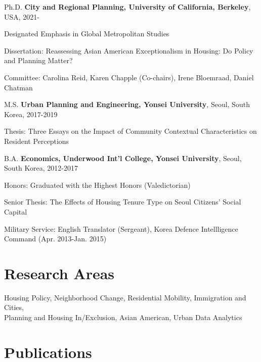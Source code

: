 \documentclass[12pt,letterpaper]{report}
\newcommand{\listitemspace}{0.4em}
\renewenvironment{itemize}
{\begin{list}{}{\setlength{\leftmargin}{0.5em}
                \setlength{\parskip}{0em}
                \setlength{\itemsep}{\listitemspace}
                \setlength{\parsep}{\listitemspace}}}
{\end{list}}
\begin{document}
    \begin{tablist}
      \item[Ph.D.] \tab{}\textbf{City and Regional Planning, University of California, Berkeley}, USA, 2021-
      \item \tab{}Designated Emphasis in Global Metropolitan Studies
      \begin{itemize}
        \item Dissertation: Reassessing Asian American Exceptionalism in Housing: Do Policy and Planning Matter?
        \vspace{-0.6em}
        \item Committee: Carolina Reid, Karen Chapple (Co-chairs), Irene Bloemraad, Daniel Chatman
    \end{itemize}
      \item[M.S.] \tab{}\textbf{Urban Planning and Engineering, Yonsei University}, Seoul, South Korea, 2017-2019
      \begin{itemize}
        \item Thesis: Three Essays on the Impact of Community Contextual Characteristics on Resident Perceptions
    \end{itemize}
      \item[B.A.] \tab{}\textbf{Economics, Underwood Int'l College, Yonsei University}, Seoul, South Korea, 2012-2017
      \begin{itemize}
        \item Honors: Graduated with the Highest Honors (Valedictorian)
        \vspace{-0.6em}
        \item Senior Thesis: The Effects of Housing Tenure Type on Seoul Citizens' Social Capital
        \vspace{-0.6em}
        \item Military Service: English Translator (Sergeant), Korea Defence Intellligence Command (Apr. 2013-Jan. 2015)
    \end{itemize}
    \end{tablist}
    
    \section*{Research Areas}
      Housing Policy, Neighborhood Change, Residential Mobility, Immigration and Cities,\\
      Planning and Housing In/Exclusion, Asian American, Urban Data Analytics
  
    \section*{Publications}
\end{document}
